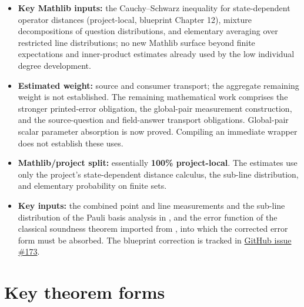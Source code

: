 \documentclass[11pt]{article}
\renewcommand{\ghissue}[1]{%
  \href{https://github.com/Dengnifer/MIPStarRE-A/issues/#1}{GitHub issue \##1}}
\begin{document}
\begin{itemize}
  decomposition that the stated sub-line lemma does not supply.  The
  candidate correction is the first-route error form, subject to the full
  two-player construction and consumer sufficiency checks.
  \item \textbf{Key Mathlib inputs:} the
  Cauchy--Schwarz inequality for state-dependent operator distances
  (project-local, blueprint Chapter 12), mixture decompositions of
  question distributions, and elementary averaging over restricted
  line distributions; no new Mathlib surface beyond finite
  expectations and inner-product estimates already used by the
  low individual degree development.
  \item \textbf{Estimated weight:} source and consumer transport; the
  aggregate remaining weight is not established. The remaining mathematical
  work comprises the stronger printed-error obligation, the global-pair
  measurement construction, and the source-question and field-answer transport
  obligations. Global-pair scalar parameter absorption is now proved.
  Compiling an immediate wrapper does not establish these uses.
  \item \textbf{Mathlib/project split:} essentially \textbf{100\%
  project-local}.  The estimates use only the project's state-dependent
  distance calculus, the sub-line distribution, and elementary
  probability on finite sets.
  \item \textbf{Key inputs:} the combined point and line measurements and
  the sub-line distribution of the Pauli basis analysis in
  \cite{Ji2020MIPStar}, and the error function of the classical soundness
  theorem imported from \cite{Ji2020LowIndividualDegree}, into which the
  corrected error form must be absorbed.  The blueprint correction is tracked
  in \ghissue{173}.
\end{itemize}

\section{Key theorem forms}
\end{document}
